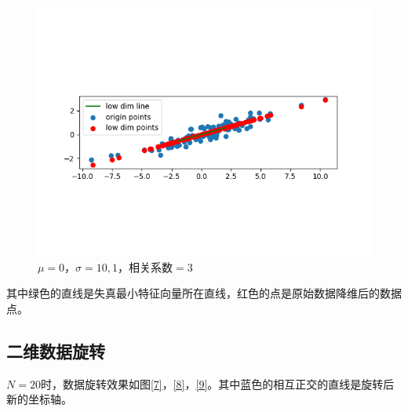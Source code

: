 \begin{figure}[htbp]
\begin{minipage}[t]{0.3\linewidth}
        \includegraphics[width=\textwidth]{figures/Figure_3.png}
        \caption{$\mu=0$，$\sigma=10,1$，相关系数$=3$}
        \label{6}
    \end{minipage}
\end{figure}

其中绿色的直线是失真最小特征向量所在直线，红色的点是原始数据降维后的数据点。

\subsection{二维数据旋转}

$N=20$时，数据旋转效果如图\ref{7}，\ref{8}，\ref{9}。其中蓝色的相互正交的直线是旋转后新的坐标轴。

